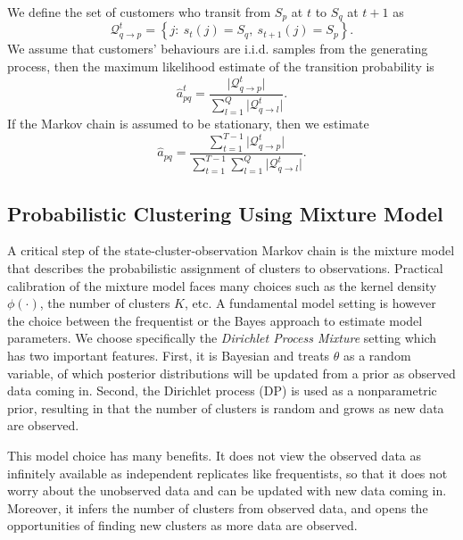 We define the set of customers who transit from $S_p$ at $t$ to $S_q$ at $t+1$ as
\begin{equation}
\mathcal{Q}_{q \rightarrow p}^t = \left\lbrace j: ~s_t(j) = S_q, ~s_{t+1}(j) = S_p \right\rbrace.
\end{equation}
We assume that customers' behaviours are i.i.d. samples from the generating process, then the maximum likelihood estimate of the transition probability is
\begin{equation}
\hat{a}^t_{pq} = \frac{\vert \mathcal{Q}_{q \rightarrow p}^t \vert}{\sum_{l=1}^Q \vert \mathcal{Q}_{q \rightarrow l}^t \vert}.
\end{equation}
If the Markov chain is assumed to be stationary, then we estimate
\begin{equation}
\hat{a}_{pq} = \frac{\sum_{t=1}^{T-1} \vert \mathcal{Q}_{q \rightarrow p}^t \vert}{\sum_{t=1}^{T-1} \sum_{l=1}^Q \vert \mathcal{Q}_{q \rightarrow l}^t \vert}.
\label{eq:transition}
\end{equation}

\subsection{Probabilistic Clustering Using Mixture Model}
\label{sec:mixtureModel}

A critical step of the state-cluster-observation Markov chain is the mixture model that describes the probabilistic assignment of clusters to observations. Practical calibration of the mixture model faces many choices such as the kernel density $\phi(\cdot)$, the number of clusters $K$, etc. A fundamental model setting is however the choice between the frequentist or the Bayes approach to estimate model parameters. We choose specifically the \textit{Dirichlet Process Mixture} setting which has two important features. First, it is Bayesian and treats $\theta$ as a random variable, of which posterior distributions will be updated from a prior as observed data coming in. Second, the Dirichlet process (DP) is used as a nonparametric prior, resulting in that the number of clusters is random and grows as new data are observed.

This model choice has many benefits. It does not view the observed data as infinitely available as independent replicates like frequentists, so that it does not worry about the unobserved data and can be updated with new data coming in. Moreover, it infers the number of clusters from observed data, and opens the opportunities of finding new clusters as more data are observed.


